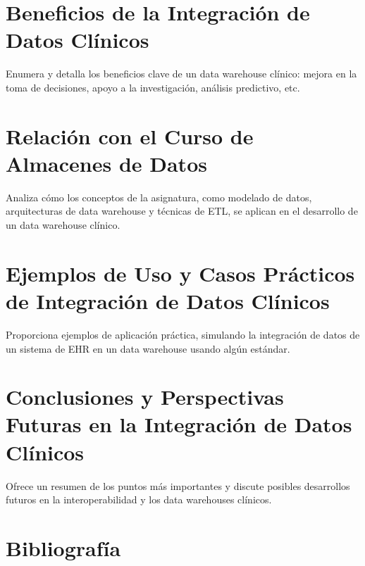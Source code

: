 \documentclass[12pt, a4paper, twoside]{article}
\begin{document}
	\section{Beneficios de la Integración de Datos Clínicos}
	Enumera y detalla los beneficios clave de un data warehouse clínico: mejora en la toma de decisiones, apoyo a la investigación, análisis predictivo, etc.
	
	\section{Relación con el Curso de Almacenes de Datos}
	Analiza cómo los conceptos de la asignatura, como modelado de datos, arquitecturas de data warehouse y técnicas de ETL, se aplican en el desarrollo de un data warehouse clínico.
	
	\section{Ejemplos de Uso y Casos Prácticos de Integración de Datos Clínicos}
	Proporciona ejemplos de aplicación práctica, simulando la integración de datos de un sistema de EHR en un data warehouse usando algún estándar.
	
	\section{Conclusiones y Perspectivas Futuras en la Integración de Datos Clínicos}
	Ofrece un resumen de los puntos más importantes y discute posibles desarrollos futuros en la interoperabilidad y los data warehouses clínicos.
	
	\section{Bibliografía}
	\printbibliography
	
	
	
\end{document}
